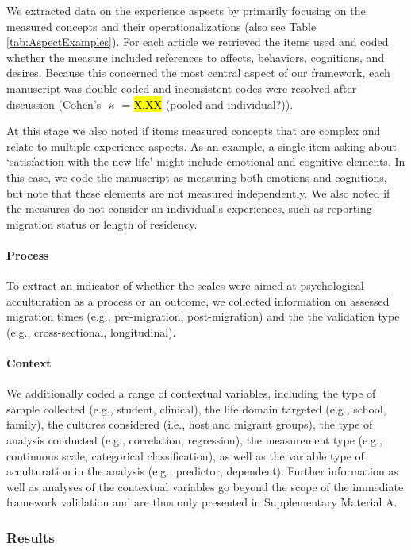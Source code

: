We extracted data on the experience aspects by primarily focusing on the
measured concepts and their operationalizations (also see Table
\ref{tab:AspectExamples}). For each article we retrieved the items used
and coded whether the measure included references to affects, behaviors,
cognitions, and desires. Because this concerned the most central aspect
of our framework, each manuscript was double-coded and inconsistent
codes were resolved after discussion (Cohen's \(\varkappa\) = \hl{X.XX}
(pooled and individual?)).

At this stage we also noted if items measured concepts that are complex
and relate to multiple experience aspects. As an example, a single item
asking about `satisfaction with the new life' might include emotional
and cognitive elements. In this case, we code the manuscript as
measuring both emotions and cognitions, but note that these elements are
not measured independently. We also noted if the measures do not
consider an individual's experiences, such as reporting migration status
or length of residency.

\paragraph{Process}

To extract an indicator of whether the scales were aimed at
psychological acculturation as a process or an outcome, we collected
information on assessed migration times (e.g., pre-migration,
post-migration) and the the validation type (e.g., cross-sectional,
longitudinal).

\paragraph{Context}

We additionally coded a range of contextual variables, including the
type of sample collected (e.g., student, clinical), the life domain
targeted (e.g., school, family), the cultures considered (i.e., host and
migrant groups), the type of analysis conducted (e.g., correlation,
regression), the measurement type (e.g., continuous scale, categorical
classification), as well as the variable type of acculturation in the
analysis (e.g., predictor, dependent). Further information as well as
analyses of the contextual variables go beyond the scope of the
immediate framework validation and are thus only presented in
Supplementary Material A.

\subsubsection{Results}

